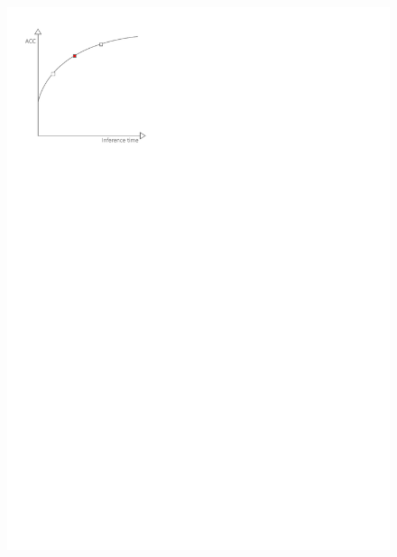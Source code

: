 \documentclass[aspectratio=169,xcolor=dvipsnames]{beamer}
\begin{document}
\begin{frame}
\begin{columns}[c]
\begin{figure}[htbp]
            \includegraphics[width=.8\textwidth]{pareto_front_disabled1.pdf}
        \end{figure}
    \end{columns}
\end{frame}
\end{document}
